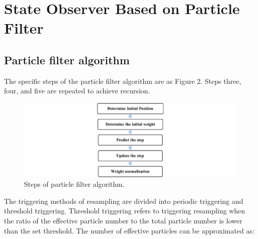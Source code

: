 \section{State Observer Based on Particle Filter}

\subsection{Particle filter algorithm}

The specific steps of the particle filter algorithm are as Figure 2. Steps three, four, and five are repeated to achieve recursion.

\begin{figure}
    \centering
    \label{stepsOfAlgorithm}
    \includegraphics{Sensor_Fusion_pictures/figure2.png}
    \caption{Steps of particle filter algorithm.}
\end{figure}

The triggering methods of resampling are divided into periodic triggering and threshold triggering. Threshold triggering refers to triggering resampling when the ratio of the effective particle number to the total particle number is lower than the set threshold. The number of effective particles can be approximated as:

\begin{equation}
    
\end{equation}